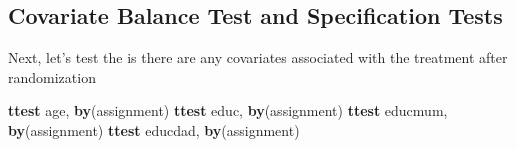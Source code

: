 \documentclass[
]{book}
\newenvironment{Shaded}{\begin{snugshade}}{\end{snugshade}}
\newcommand{\KeywordTok}[1]{\textcolor[rgb]{0.13,0.29,0.53}{\textbf{#1}}}
\newcommand{\NormalTok}[1]{#1}
\begin{document}
\subsection{Covariate Balance Test and Specification Tests}\label{covariate-balance-test-and-specification-tests}

Next, let's test the is there are any covariates associated with the treatment after randomization

\begin{Shaded}
\begin{Highlighting}[]

\KeywordTok{ttest}\NormalTok{ age, }\KeywordTok{by}\NormalTok{(assignment)}
\KeywordTok{ttest}\NormalTok{ educ, }\KeywordTok{by}\NormalTok{(assignment)}
\KeywordTok{ttest}\NormalTok{ educmum, }\KeywordTok{by}\NormalTok{(assignment)}
\KeywordTok{ttest}\NormalTok{ educdad, }\KeywordTok{by}\NormalTok{(assignment)}
\end{Highlighting}
\end{Shaded}
\end{document}
